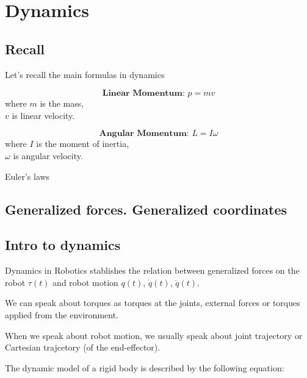\section{Dynamics}



\subsection{Recall}

Let's recall the main formulas in dynamics


\begin{minipage}{0.45\textwidth}
    \begin{equation}
    \textbf{Linear Momentum: } p = mv
    \end{equation}
    where $m$ is the mass,\\
    $v$ is linear velocity.
    \end{minipage}
    \hfill
    \begin{minipage}{0.45\textwidth}
    \begin{equation}
    \textbf{Angular Momentum: } L = I\omega
    \end{equation}
    where $I$ is the moment of inertia,\\
    $\omega$ is angular velocity.
\end{minipage}


Euler's laws

\subsection{Generalized forces. Generalized coordinates}


\subsection{Intro to dynamics}

Dynamics in Robotics stablishes the relation between generalized forces on the robot {$\tau(t)$} and 
robot motion {$q(t)$, $\dot q(t)$, $\ddot q(t)$}. 

We can speak about torques as torques at the joints, external forces or torques applied from the environment. 

When we speak about robot motion, we usually speak about joint trajectory or Cartesian trajcetory (of the end-effector). 

The dynamic model of a rigid body is described by the following equation:

